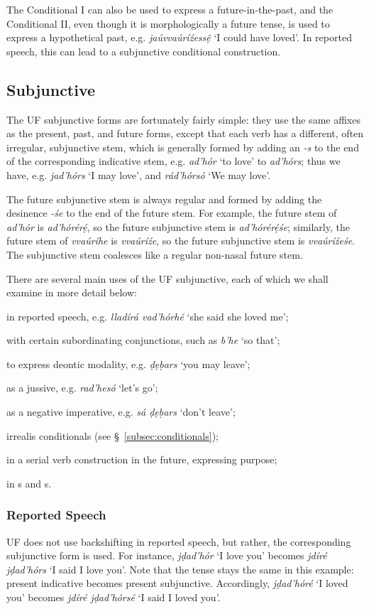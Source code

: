 \documentclass[a4paper, 12pt, twoside, final]{article}
\newlength{\EnumItemSep} \EnumItemSep-3pt
\newenvironment { enum } [1] [0] {
    \vspace { -.5em }
    \settowidth \leftmargini { 99.\hskip\labelsep }
    \begin { enumerate }
    \setcounter { enumi } { #1 }
    \itemsep \EnumItemSep
} {
    \end { enumerate }
    \vspace { -.5em }
}
\let \w \textit
\begin{document}
The Conditional I can also be used to express a future-in-the-past, and the Conditional II, even though it is
morphologically a future tense, is used to express a hypothetical past, e.g. \w{jaúvvaúríźessệ} ‘I could have loved’.
In reported speech, this can lead to a subjunctive conditional construction.


\subsection{Subjunctive}\label{subsec:subjunctive}
The UF subjunctive forms are fortunately fairly simple: they use the same affixes as the present, past, and future
forms, except that each verb has a different, often irregular, subjunctive stem, which is generally formed
by adding an \w{-s} to the end of the corresponding indicative stem, e.g. \w{ad’hór} ‘to love’ to \w{ad’hórs};
thus we have, e.g. \w{jad’hórs} ‘I may love’, and \w{rád’hórsó} ‘We may love’.

The future subjunctive stem is always regular and formed by adding the desinence \w{-śe} to the end of the future stem. For example,
the future stem of \w{ad’hór} is \w{ad’hórérẹ́}, so the future subjunctive stem is \w{ad’hórérẹ́śe}; similarly, the future
stem of \w{vvaúríhe} is \w{vvaúríźe}, so the future subjunctive stem is \w{vvaúríźeśe}. The subjunctive stem coalesces like
a regular non-nasal future stem.

There are several main uses of the UF subjunctive, each of which we shall examine in more detail below:
\begin{enum}
\item in reported speech, e.g. \w{lladírá vad’hórhé} ‘she said she loved me’;
\item with certain subordinating conjunctions, such as \w{b’he} ‘so that’;
\item to express deontic modality, e.g. \w{ḍẹḅars} ‘you may leave’;
\item as a jussive, e.g. \w{rad’hesó} ‘let’s go’;
\item as a negative imperative, e.g. \w{sá ḍẹḅars} ‘don’t leave’;
\item irrealis conditionals (see §~\ref{subsec:conditionals});
\item in a serial verb construction in the future, expressing purpose;
\item in s and s.
\end{enum}

\subsubsection{Reported Speech}
UF does not use backshifting in reported speech, but rather, the corresponding subjunctive form is used. For instance,
\w{jḍad’hór} ‘I love you’ becomes \w{jdíré jḍad’hórs} ‘I said I love you’. Note that the tense stays the same in this
example: present indicative becomes present subjunctive. Accordingly, \w{jḍad’hóré} ‘I loved you’ becomes \w{jdíré
jḍad’hórsé} ‘I said I loved you’.
\end{document}
